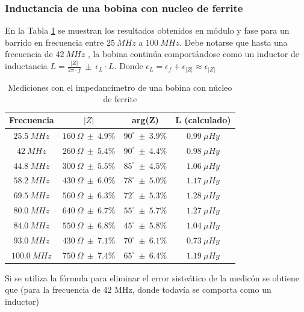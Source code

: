 \documentclass[a4paper,10pt]{article}
\begin{document}
		\subsubsection{Inductancia de una bobina con nucleo de ferrite}
		
		\indent En la Tabla \ref{tabIMPbobina} se muestran los resultados 
		obtenidos en m\'odulo y fase para un barrido en frecuencia entre 
		$25~MHz$ a $100~MHz$. Debe notarse que hasta una frecuencia de  $42~MHz$
		, la bobina contin\'ua comport\'andose como un inductor de inductancia 
		$L=\frac{\left|Z\right|}{2\pi\cdot f}~\pm~\epsilon_L\cdot L$. Donde 
		$\epsilon_L=\epsilon_f+\epsilon_{\left|Z\right|}\approx
		\epsilon_{\left|Z\right|}$
		
		\begin{table}[!htp]
			\centering
			\begin{tabular}{|c|c|c|c|}
				\hline
				Frecuencia & $\left|Z\right|$ & arg(Z)  & L (calculado) \\
				\hline
				$25.5~MHz$ & $160~\Omega~\pm~4.9\%$ & $90^{\circ}~\pm~3.9\%$ & 
				$0.99~\mu Hy$ \\
				\hline
				$42~MHz$ & $260~\Omega~\pm~5.4\%$ & $90^{\circ}~\pm~4.4\%$ & 
				$0.98~\mu Hy$\\
				\hline
				$44.8~MHz$ & $300~\Omega~\pm~5.5\%$ & $85^{\circ}~\pm~4.5\%$ & 
				$1.06~\mu Hy$ \\
				\hline
				$58.2~MHz$ & $430~\Omega~\pm~6.0\%$ & $78^{\circ}~\pm~5.0\%$ & 
				$1.17~\mu Hy$ \\
				\hline									
				$69.5~MHz$ & $560~\Omega~\pm~6.3\%$ & $72^{\circ}~\pm~5.3\%$ & 
				$1.28~\mu Hy$ \\
				\hline									
				$80.0~MHz$& $640~\Omega~\pm~6.7\%$ & $55^{\circ}~\pm~5.7\%$ & 
				$1.27~\mu Hy$ \\
				\hline									
				$84.0~MHz$ & $550~\Omega~\pm~6.8\%$ & $45^{\circ}~\pm~5.8\%$ & 
				$1.04~\mu Hy$ \\
				\hline									
				$93.0~MHz$ & $430~\Omega~\pm~7.1\%$ & $70^{\circ}~\pm~6.1\%$ & 
				$0.73~\mu Hy$ \\
				\hline									
				$100.0~MHz$ & $750~\Omega~\pm~7.4\%$ & $65^{\circ}~\pm~6.4\%$ & 
				$1.19~\mu Hy$ \\
				\hline			
			\end{tabular}
			\caption{Mediciones con el impedanc\'imetro de una bobina con 
			n\'ucleo de ferrite} \label{tabIMPbobina}
		\end{table}	
		
		\indent Si se utiliza la f\'ormula para eliminar el error siste\'atico 
		de la medic\'on se obtiene que (para la frecuencia de 42 MHz, donde 
		todav\'ia se comporta como un inductor)
		
\end{document}
